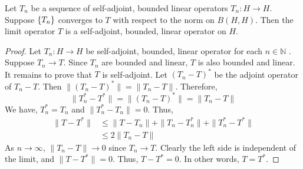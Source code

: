 \begin{theorem}
	Let $T_n$ be a sequence of self-adjoint, bounded linear operators $T_n : H \to H$.
	Suppose $\left\{T_n\right\}$ converges to $T$ with respect to the norm on $B(H,H)$.
	Then the limit operator $T$ is a self-adjoint, bounded, linear operator on $H$.
\end{theorem}
\begin{proof}
	Let $T_n : H \to H$ be self-adjoint, bounded, linear operator for each $n \in \mathbb{N}$ .
	Suppose $T_n \to T$.
	Since $T_n$ are bounded and linear, $T$ is also bounded and linear.\\

	It remains to prove that $T$ is self-adjoint.
	Let $(T_n-T)^\ast$ be the adjoint operator of $T_n-T$.
	Then $\|(T_n-T)^\ast\| = \|T_n-T\|$.
	Therefore,
	\[ \|T_n^\ast - T^\ast\| = \|(T_n-T)^\ast\| = \|T_n-T\| \]
	We have, $T_n^\ast = T_n$ and $\|T_n^\ast - T_n\| = 0 $.
	Thus,
	\begin{align*}
		\|T-T^\ast\| & \le \|T-T_n\| + \|T_n - T_n^\ast\| + \|T_n^\ast - T^\ast\|\\
		& \le 2\|T_n - T\|
	\end{align*}
	As $n \to \infty$, $\|T_n - T\| \to 0$ since $T_n \to T$.
	Clearly the left side is independent of the limit, and $\|T-T^\ast\| = 0$.
	Thus, $T-T^\ast = 0$.
	In other words, $T = T^\ast$.
\end{proof}

